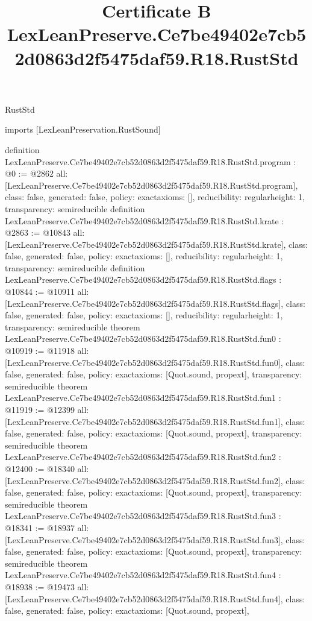 \begin{lexlean}{RustStd}
\title{Certificate B LexLeanPreserve.Ce7be49402e7cb52d0863d2f5475daf59.R18.RustStd}
\begin{coremodule}
imports [LexLeanPreservation.RustSound]

definition LexLeanPreserve.Ce7be49402e7cb52d0863d2f5475daf59.R18.RustStd.program : @0 := @2862 {
  all: [LexLeanPreserve.Ce7be49402e7cb52d0863d2f5475daf59.R18.RustStd.program],
  class: false,
  generated: false,
  policy: exact{axioms: []},
  reducibility: regular{height: 1},
  transparency: semireducible
}
definition LexLeanPreserve.Ce7be49402e7cb52d0863d2f5475daf59.R18.RustStd.krate : @2863 := @10843 {
  all: [LexLeanPreserve.Ce7be49402e7cb52d0863d2f5475daf59.R18.RustStd.krate],
  class: false,
  generated: false,
  policy: exact{axioms: []},
  reducibility: regular{height: 1},
  transparency: semireducible
}
definition LexLeanPreserve.Ce7be49402e7cb52d0863d2f5475daf59.R18.RustStd.flags : @10844 := @10911 {
  all: [LexLeanPreserve.Ce7be49402e7cb52d0863d2f5475daf59.R18.RustStd.flags],
  class: false,
  generated: false,
  policy: exact{axioms: []},
  reducibility: regular{height: 1},
  transparency: semireducible
}
theorem LexLeanPreserve.Ce7be49402e7cb52d0863d2f5475daf59.R18.RustStd.fun0 : @10919 := @11918 {
  all: [LexLeanPreserve.Ce7be49402e7cb52d0863d2f5475daf59.R18.RustStd.fun0],
  class: false,
  generated: false,
  policy: exact{axioms: [Quot.sound, propext]},
  transparency: semireducible
}
theorem LexLeanPreserve.Ce7be49402e7cb52d0863d2f5475daf59.R18.RustStd.fun1 : @11919 := @12399 {
  all: [LexLeanPreserve.Ce7be49402e7cb52d0863d2f5475daf59.R18.RustStd.fun1],
  class: false,
  generated: false,
  policy: exact{axioms: [Quot.sound, propext]},
  transparency: semireducible
}
theorem LexLeanPreserve.Ce7be49402e7cb52d0863d2f5475daf59.R18.RustStd.fun2 : @12400 := @18340 {
  all: [LexLeanPreserve.Ce7be49402e7cb52d0863d2f5475daf59.R18.RustStd.fun2],
  class: false,
  generated: false,
  policy: exact{axioms: [Quot.sound, propext]},
  transparency: semireducible
}
theorem LexLeanPreserve.Ce7be49402e7cb52d0863d2f5475daf59.R18.RustStd.fun3 : @18341 := @18937 {
  all: [LexLeanPreserve.Ce7be49402e7cb52d0863d2f5475daf59.R18.RustStd.fun3],
  class: false,
  generated: false,
  policy: exact{axioms: [Quot.sound, propext]},
  transparency: semireducible
}
theorem LexLeanPreserve.Ce7be49402e7cb52d0863d2f5475daf59.R18.RustStd.fun4 : @18938 := @19473 {
  all: [LexLeanPreserve.Ce7be49402e7cb52d0863d2f5475daf59.R18.RustStd.fun4],
  class: false,
  generated: false,
  policy: exact{axioms: [Quot.sound, propext]},
}
\end{coremodule}
\end{lexlean}
